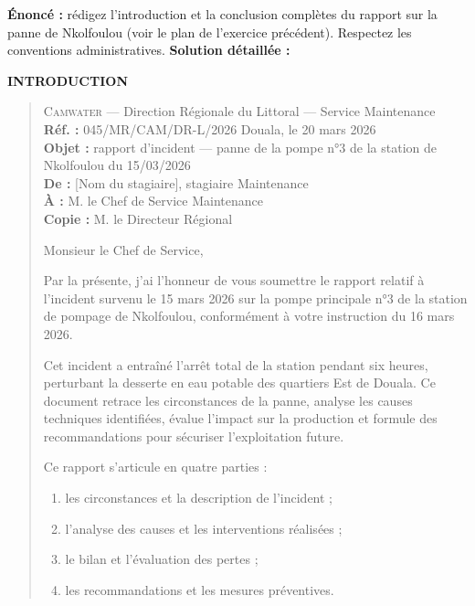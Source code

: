 \documentclass[11pt]{article}
\begin{document}
\begin{exoresolu}
    \textbf{Énoncé :} rédigez l'introduction et la conclusion complètes du rapport sur la panne de Nkolfoulou (voir le plan de l'exercice précédent). Respectez les conventions administratives.
    \tcblower
    \textbf{Solution détaillée :}

    \textbf{INTRODUCTION}
    \begin{quote}
    \textsc{Camwater} — Direction Régionale du Littoral — Service Maintenance\\
    \textbf{Réf. :} 045/MR/CAM/DR-L/2026 \hfill Douala, le 20 mars 2026\\
    \textbf{Objet :} rapport d'incident — panne de la pompe n°3 de la station de Nkolfoulou du 15/03/2026\\
    \textbf{De :} [Nom du stagiaire], stagiaire Maintenance\\
    \textbf{À :} M. le Chef de Service Maintenance\\
    \textbf{Copie :} M. le Directeur Régional
    \vspace{0.3cm}

    Monsieur le Chef de Service,

    Par la présente, j'ai l'honneur de vous soumettre le rapport relatif à l'incident survenu le 15 mars 2026 sur la pompe principale n°3 de la station de pompage de Nkolfoulou, conformément à votre instruction du 16 mars 2026.

    Cet incident a entraîné l'arrêt total de la station pendant six heures, perturbant la desserte en eau potable des quartiers Est de Douala. Ce document retrace les circonstances de la panne, analyse les causes techniques identifiées, évalue l'impact sur la production et formule des recommandations pour sécuriser l'exploitation future.

    Ce rapport s'articule en quatre parties :
    \begin{enumerate}
        \item les circonstances et la description de l'incident ;
        \item l'analyse des causes et les interventions réalisées ;
        \item le bilan et l'évaluation des pertes ;
        \item les recommandations et les mesures préventives.
    \end{enumerate}
    \end{quote}


\end{exoresolu}
\end{document}
